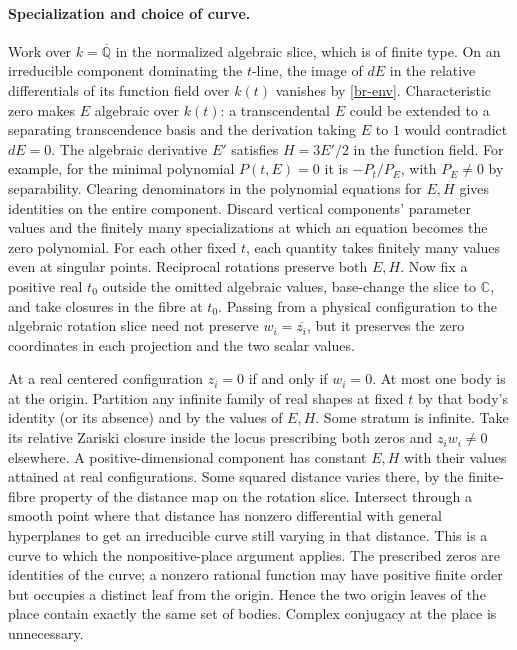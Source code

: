 \documentclass[11pt,letterpaper]{article}
\theoremstyle{definition}
\begin{document}
\paragraph{Specialization and choice of curve.}
Work over $k=\overline{\mathbb Q}$ in the normalized algebraic slice,
which is of finite type. On an irreducible component dominating the
$t$-line, the image of $dE$ in the relative differentials of its
function field over $k(t)$ vanishes by \eqref{br-env}.
Characteristic zero makes $E$ algebraic over $k(t)$: a
transcendental $E$ could be extended to a separating transcendence
basis and the derivation taking $E$ to $1$ would contradict $dE=0$.
The algebraic derivative $E'$ satisfies $H=3E'/2$ in the function
field. For example, for the minimal polynomial $P(t,E)=0$ it is
$-P_t/P_E$, with $P_E\ne0$ by separability. Clearing denominators in
the polynomial equations for $E,H$ gives identities on the entire
component. Discard vertical components' parameter values and the
finitely many specializations at which an equation becomes the zero
polynomial. For each other fixed $t$, each quantity takes finitely
many values even at singular points. Reciprocal rotations preserve
both $E,H$. Now fix a positive real $t_0$ outside the omitted algebraic values, base-change the slice to $\mathbb C$, and take closures in the fibre at $t_0$. Passing from a physical configuration to the algebraic rotation slice need not preserve $w_i=\overline{z_i}$, but it preserves the zero coordinates in each projection and the two scalar values.

At a real centered configuration $z_i=0$ if and only if $w_i=0$.
At most one body is at the origin. Partition any infinite family
of real shapes at fixed $t$ by that body's identity (or its absence)
and by the values of $E,H$. Some stratum is infinite.
Take its relative Zariski closure inside the locus prescribing both
zeros and $z_iw_i\ne0$ elsewhere. A positive-dimensional component
has constant $E,H$ with their values attained at real configurations.
Some squared distance varies there, by the finite-fibre property of
the distance map on the rotation slice. Intersect through a smooth
point where that distance has nonzero differential with general
hyperplanes to get an irreducible curve still varying in that
distance. This is a curve to which the nonpositive-place argument
applies. The prescribed zeros are identities of the curve; a
nonzero rational function may have positive finite order but occupies
a distinct leaf from the origin. Hence the two origin leaves of
the place contain exactly the same set of bodies. Complex conjugacy
at the place is unnecessary.
\end{document}
